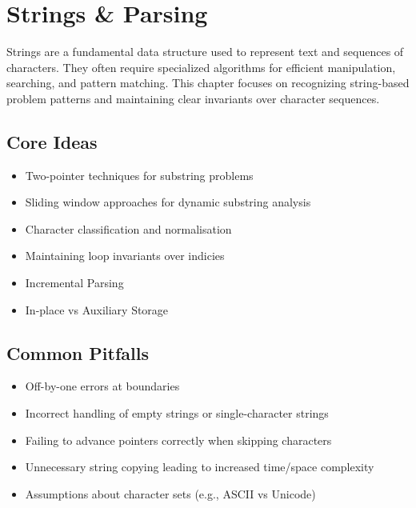 \section{Strings \& Parsing}

Strings are a fundamental data structure used to represent text and sequences of characters.
They often require specialized algorithms for efficient manipulation, searching, and pattern matching.
This chapter focuses on recognizing string-based problem patterns and maintaining clear invariants over character sequences.

\subsection{Core Ideas}
\begin{itemize}[nosep]
  \item Two-pointer techniques for substring problems
  \item Sliding window approaches for dynamic substring analysis
  \item Character classification and normalisation
  \item Maintaining loop invariants over indicies
  \item Incremental Parsing
  \item In-place vs Auxiliary Storage
\end{itemize}

\subsection{Common Pitfalls}
\begin{itemize}[nosep]
  \item Off-by-one errors at boundaries
  \item Incorrect handling of empty strings or single-character strings
  \item Failing to advance pointers correctly when skipping characters
  \item Unnecessary string copying leading to increased time/space complexity
  \item Assumptions about character sets (e.g., ASCII vs Unicode)

\end{itemize}




